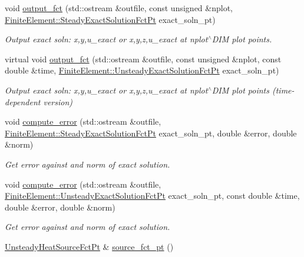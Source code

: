 \begin{DoxyCompactItemize}
void \hyperlink{classoomph_1_1UnsteadyHeatEquations_acdd4e941a196d267ad9534aef16db1a9}{output\+\_\+fct} (std\+::ostream \&outfile, const unsigned \&nplot, \hyperlink{classoomph_1_1FiniteElement_a690fd33af26cc3e84f39bba6d5a85202}{Finite\+Element\+::\+Steady\+Exact\+Solution\+Fct\+Pt} exact\+\_\+soln\+\_\+pt)
\begin{DoxyCompactList}\small\item\em Output exact soln\+: x,y,u\+\_\+exact or x,y,z,u\+\_\+exact at nplot$^\wedge$\+D\+IM plot points. \end{DoxyCompactList}\item 
virtual void \hyperlink{classoomph_1_1UnsteadyHeatEquations_ab6f0a3d6afeec2fc0395f6185d91e588}{output\+\_\+fct} (std\+::ostream \&outfile, const unsigned \&nplot, const double \&time, \hyperlink{classoomph_1_1FiniteElement_ad4ecf2b61b158a4b4d351a60d23c633e}{Finite\+Element\+::\+Unsteady\+Exact\+Solution\+Fct\+Pt} exact\+\_\+soln\+\_\+pt)
\begin{DoxyCompactList}\small\item\em Output exact soln\+: x,y,u\+\_\+exact or x,y,z,u\+\_\+exact at nplot$^\wedge$\+D\+IM plot points (time-\/dependent version) \end{DoxyCompactList}\item 
void \hyperlink{classoomph_1_1UnsteadyHeatEquations_a14e50a4b041d961cf3450788a3e231f0}{compute\+\_\+error} (std\+::ostream \&outfile, \hyperlink{classoomph_1_1FiniteElement_a690fd33af26cc3e84f39bba6d5a85202}{Finite\+Element\+::\+Steady\+Exact\+Solution\+Fct\+Pt} exact\+\_\+soln\+\_\+pt, double \&error, double \&norm)
\begin{DoxyCompactList}\small\item\em Get error against and norm of exact solution. \end{DoxyCompactList}\item 
void \hyperlink{classoomph_1_1UnsteadyHeatEquations_ab6d9162fbdc253de4cc7064e3c1459aa}{compute\+\_\+error} (std\+::ostream \&outfile, \hyperlink{classoomph_1_1FiniteElement_ad4ecf2b61b158a4b4d351a60d23c633e}{Finite\+Element\+::\+Unsteady\+Exact\+Solution\+Fct\+Pt} exact\+\_\+soln\+\_\+pt, const double \&time, double \&error, double \&norm)
\begin{DoxyCompactList}\small\item\em Get error against and norm of exact solution. \end{DoxyCompactList}\item 
\hyperlink{classoomph_1_1UnsteadyHeatEquations_a967135cc2be2cb4b16fe0dc0b4d68a68}{Unsteady\+Heat\+Source\+Fct\+Pt} \& \hyperlink{classoomph_1_1UnsteadyHeatEquations_a8bd87b25f079be4dbee6edfc00127d47}{source\+\_\+fct\+\_\+pt} ()

\end{DoxyCompactItemize}
